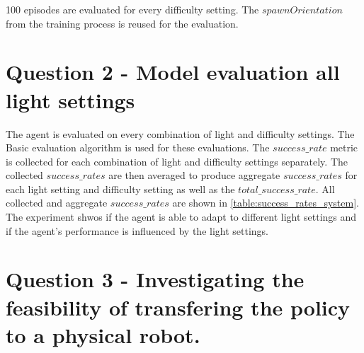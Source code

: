100 episodes are evaluated for every difficulty setting. The $spawnOrientation$ from the training process is reused for the evaluation. 


\section{Question 2 - Model evaluation all light settings}

The agent is evaluated on every combination of light and difficulty settings. The Basic evaluation algorithm is used for these evaluations.
The $success\_rate$ metric is collected for each combination of light and difficulty settings separately. The collected $success\_rates$ are then averaged to produce aggregate $success\_rates$ for each light setting and difficulty setting as well as the $total\_success\_rate$. All collected and aggregate $success\_rates$ are shown in \ref{table:success_rates_system}.
The experiment shwos if the agent is able to adapt to different light settings and if the agent's performance is influenced by the light settings.

\begin{table}
\begin{center}
\end{center}
\caption{Collected and aggregate success\_rate metrics}
\label{table:success_rates_system}
\end{table}


\section{Question 3 - Investigating the feasibility of transfering the policy to a physical robot.}

